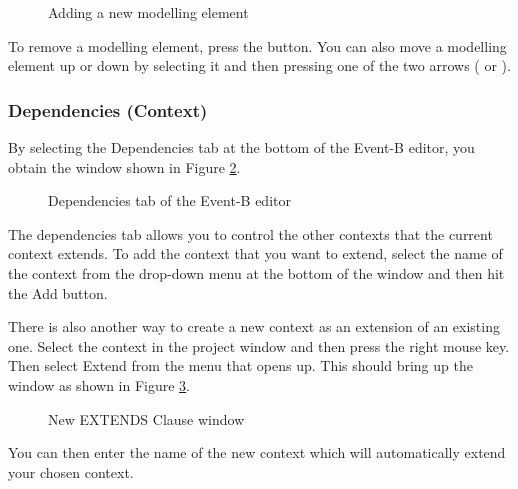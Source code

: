 \begin{figure}[!ht]
\begin{center}
	\caption{Adding a new modelling element}
	\label{fig_ref_01_eventb_editor3}
\end{center}
\end{figure}

To remove a modelling element, press the  button. You can also move a modelling element up or down by selecting it and then pressing one of the two arrows ( or ).

\subsubsection{Dependencies (Context)}

By selecting the \textsf{Dependencies} tab at the bottom of the Event-B editor, you obtain the window shown in Figure \ref{fig_ref_01_eventb_editor8}.

\begin{figure}[!ht]
\begin{center}
	\caption{Dependencies tab of the Event-B editor}
	\label{fig_ref_01_eventb_editor8}
\end{center}
\end{figure}

The dependencies tab allows you to control the other contexts that the current context extends. To add the context that you want to extend, select the name of the context from the drop-down menu at the bottom of the window and then hit the \textsf{Add} button.

There is also another way to create a new context as an extension of an existing one. Select the context in the project window and then press the right mouse key. Then select \textsf{Extend} from the menu that opens up. This should bring up the window as shown in Figure \ref{fig_ref_01_eventb_editor9}.

\begin{figure}[!ht]
\begin{center}
	\caption{New EXTENDS Clause window}
	\label{fig_ref_01_eventb_editor9}
\end{center}
\end{figure}

You can then enter the name of the new context which will automatically extend your chosen context. 

